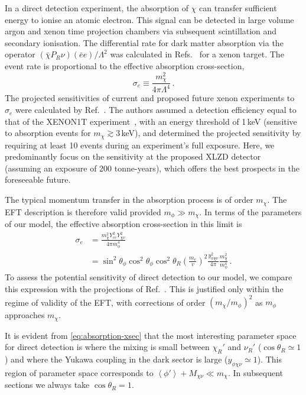 \documentclass[aps, prd, reprint, nofootinbib, amsmath, amssymb, floatfix]{revtex4-2}
\newcommand{\vev}[1]{\left< #1 \right>}      %
\begin{document}
In a direct detection experiment, the absorption of $\chi$ can transfer sufficient energy to ionise an atomic electron. This signal can be detected in large volume argon and xenon time projection chambers via subsequent scintillation and secondary ionisation. The differential rate for dark matter absorption via the operator $(\bar{\chi}P_R\nu)(\bar{e}e)/\Lambda^2$ was calculated in Refs.~\cite{Dror:2020czw,Ge:2022ius} for a xenon target. The event rate is proportional to the effective absorption cross-section,
%
\begin{equation}
    \sigma_e \equiv \frac{m_\chi^2}{4\pi\Lambda^4} \,.
\end{equation}
%
The projected sensitivities of current and proposed future xenon experiments to $\sigma_e$ were calculated by Ref.~\cite{Dror:2020czw}. The authors assumed a detection efficiency equal to that of the XENON1T experiment~\cite{XENON:2020rca}, with an energy threshold of 1\,keV (sensitive to absorption events for $m_\chi \gtrsim 3$\,keV), and determined the projected sensitivity by requiring at least 10 events during an experiment's full exposure. Here, we predominantly focus on the sensitivity at the proposed XLZD detector~\cite{DARWIN:2016hyl} (assuming an exposure of 200 tonne-years), which offers the best prospects in the foreseeable future.

The typical momentum transfer in the absorption process is of order $m_\chi$. The EFT description is therefore valid provided $m_\phi \gg m_\chi$. In terms of the parameters of our model, the effective absorption cross-section in this limit is
%
\begin{align}
    \sigma_e & = \frac{m_\chi^2 Y_{ee}^2 Y_{\chi\nu}^2}{4\pi m_\phi^4}\\
    & = \sin^2\theta_\phi\cos^2\theta_\phi \cos^2\theta_R \left(\frac{m_e}{v}\right)^2 \frac{y_{\phi\chi\nu}^2}{4 \pi} \frac{m_\chi^2}{m_{\phi}^4} \,. \label{eq:absorption-xsec}
\end{align}
%
To assess the potential sensitivity of direct detection to our model, we compare this expression with the projections of Ref.~\cite{Dror:2020czw}. This is justified only within the regime of validity of the EFT, with corrections of order $(m_\chi/m_\phi)^2$ as $m_\phi$ approaches $m_\chi$.

It is evident from \cref{eq:absorption-xsec} that the most interesting parameter space for direct detection is where the mixing is small between $\chi_R'$ and $\nu_R'$ ($\cos\theta_R \simeq 1$) and where the Yukawa coupling in the dark sector is large ($y_{\phi\chi\nu} \simeq 1$). This region of parameter space corresponds to $\vev{\phi'} + M_{\chi\nu} \ll m_\chi$. In subsequent sections we always take $\cos\theta_R = 1$.
\end{document}
